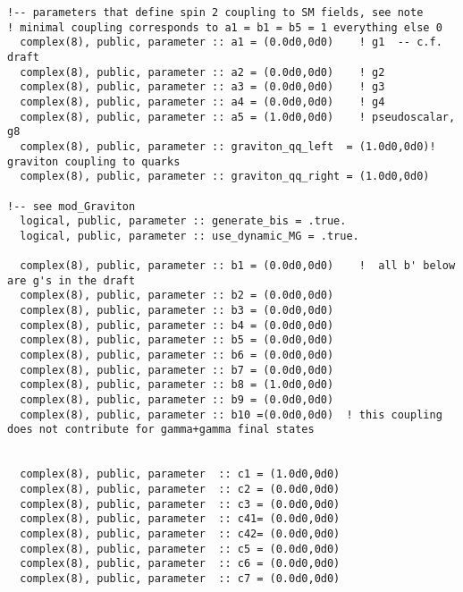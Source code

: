 \documentclass[aps,superscriptaddress,nofootinbib]{revtex4}
\begin{document}
\footnotesize
\begin{verbatim}
!-- parameters that define spin 2 coupling to SM fields, see note
! minimal coupling corresponds to a1 = b1 = b5 = 1 everything else 0
  complex(8), public, parameter :: a1 = (0.0d0,0d0)    ! g1  -- c.f. draft
  complex(8), public, parameter :: a2 = (0.0d0,0d0)    ! g2
  complex(8), public, parameter :: a3 = (0.0d0,0d0)    ! g3
  complex(8), public, parameter :: a4 = (0.0d0,0d0)    ! g4
  complex(8), public, parameter :: a5 = (1.0d0,0d0)    ! pseudoscalar, g8
  complex(8), public, parameter :: graviton_qq_left  = (1.0d0,0d0)! graviton coupling to quarks
  complex(8), public, parameter :: graviton_qq_right = (1.0d0,0d0)

!-- see mod_Graviton
  logical, public, parameter :: generate_bis = .true.
  logical, public, parameter :: use_dynamic_MG = .true.

  complex(8), public, parameter :: b1 = (0.0d0,0d0)    !  all b' below are g's in the draft
  complex(8), public, parameter :: b2 = (0.0d0,0d0)
  complex(8), public, parameter :: b3 = (0.0d0,0d0)
  complex(8), public, parameter :: b4 = (0.0d0,0d0)
  complex(8), public, parameter :: b5 = (0.0d0,0d0)
  complex(8), public, parameter :: b6 = (0.0d0,0d0)
  complex(8), public, parameter :: b7 = (0.0d0,0d0)
  complex(8), public, parameter :: b8 = (1.0d0,0d0)
  complex(8), public, parameter :: b9 = (0.0d0,0d0)
  complex(8), public, parameter :: b10 =(0.0d0,0d0)  ! this coupling does not contribute for gamma+gamma final states


  complex(8), public, parameter  :: c1 = (1.0d0,0d0)
  complex(8), public, parameter  :: c2 = (0.0d0,0d0)
  complex(8), public, parameter  :: c3 = (0.0d0,0d0)
  complex(8), public, parameter  :: c41= (0.0d0,0d0)
  complex(8), public, parameter  :: c42= (0.0d0,0d0)
  complex(8), public, parameter  :: c5 = (0.0d0,0d0)
  complex(8), public, parameter  :: c6 = (0.0d0,0d0)
  complex(8), public, parameter  :: c7 = (0.0d0,0d0)
\end{verbatim}
\normalsize
\end{document}
